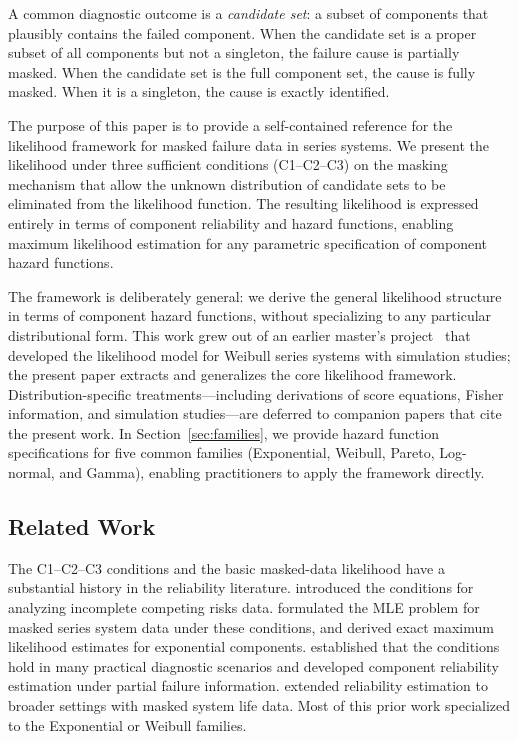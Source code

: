 \documentclass[11pt]{article}
\theoremstyle{definition}
\theoremstyle{plain}
\begin{document}
A common diagnostic outcome is a \emph{candidate set}: a subset of
components that plausibly contains the failed component.
When the candidate set is a proper subset of all components but not a
singleton, the failure cause is partially masked.
When the candidate set is the full component set, the cause is fully masked.
When it is a singleton, the cause is exactly identified.

The purpose of this paper is to provide a self-contained reference for
the likelihood framework for masked failure data in series systems.
We present the likelihood under three sufficient conditions
(C1--C2--C3) on the masking mechanism that allow the unknown distribution
of candidate sets to be eliminated from the likelihood function.
The resulting likelihood is expressed entirely in terms of component
reliability and hazard functions, enabling maximum likelihood estimation
for any parametric specification of component hazard functions.

The framework is deliberately general:
we derive the general likelihood structure in terms of component hazard
functions, without specializing to any particular distributional form.
This work grew out of an earlier master's
project~\citep{towell2023masters} that developed the likelihood model
for Weibull series systems with simulation studies; the present paper
extracts and generalizes the core likelihood framework.
Distribution-specific treatments---including derivations of score
equations, Fisher information, and simulation studies---are deferred to
companion papers that cite the present work.
In Section~\ref{sec:families}, we provide hazard function specifications
for five common families (Exponential, Weibull, Pareto, Log-normal,
and Gamma), enabling practitioners to apply the framework directly.

\subsection{Related Work}
\label{sec:related-work}

The C1--C2--C3 conditions and the basic masked-data likelihood have a
substantial history in the reliability literature.
\citet{miyakawa1984} introduced the conditions for analyzing incomplete
competing risks data.
\citet{Usher-1988} formulated the MLE problem for masked series system
data under these conditions, and \citet{Lin-1993} derived exact maximum
likelihood estimates for exponential components.
\citet{guess1991} established that the conditions hold in many practical
diagnostic scenarios and developed component reliability estimation under
partial failure information.
\citet{Amma-2001} extended reliability estimation to broader settings
with masked system life data.
Most of this prior work specialized to the Exponential or Weibull
families.
\end{document}
